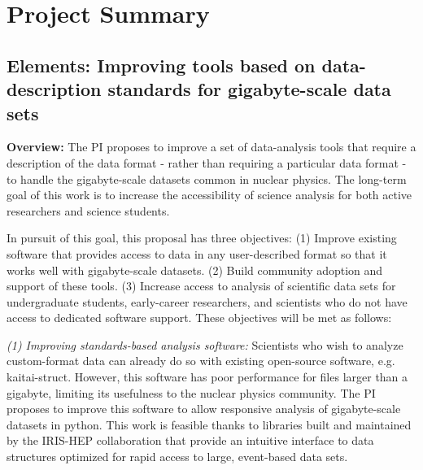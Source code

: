 
\section*{Project Summary}
\subsection*{Elements: Improving tools based on data-description standards for gigabyte-scale data sets}

{\bf Overview:} The PI proposes to improve a set of data-analysis tools that require a description of the data format - rather than requiring a particular data format - to handle the gigabyte-scale datasets common in nuclear physics. The long-term goal of this work is to increase the accessibility of science analysis for both active researchers and science students.  %

In pursuit of this goal, this proposal has three objectives:  
(1) Improve existing software that provides access to data in any user-described format so that it works well with gigabyte-scale datasets.
(2) Build community adoption and support of these tools.
(3) Increase access to analysis of scientific data sets for undergraduate students, early-career researchers, and scientists who do not have access to dedicated software support. 
These objectives will be met as follows:


{\it (1) Improving standards-based analysis software:} Scientists who wish to analyze custom-format data can already do so with existing open-source software, e.g. kaitai-struct.  However, this software has poor performance for files larger than a gigabyte,  limiting its usefulness to the nuclear physics community.  The PI proposes to improve this software to allow responsive analysis of gigabyte-scale datasets in python.  This work is feasible thanks to libraries built and maintained by the IRIS-HEP collaboration that provide an intuitive interface to data structures optimized for rapid access to large, event-based data sets.

